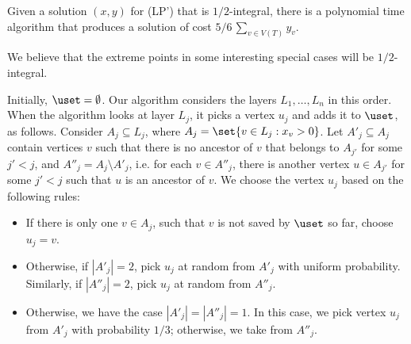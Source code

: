 \begin{theorem} 
Given a solution $(x,y)$ for (LP') that is $1/2$-integral, there is a polynomial time algorithm that produces a solution of cost $5/6\,\sum_{v \in V(T)} y_v$.  
\label{thm:12intalgo}
\end{theorem} 

We believe that the extreme points in some interesting special cases will be $1/2$-integral. 

\vspace{0.1in} 

Initially, $\uset = \emptyset$. 
Our algorithm considers the layers $L_1,\ldots, L_n$ in this order.
When the algorithm looks at layer $L_j$, it picks a vertex $u_j$ and adds it to $\uset$, as follows. 
Consider $A_j \subseteq L_j$, where $A_j = \set{v \in L_j: x_v >0}$.
Let $A'_j \subseteq A_j$ contain vertices $v$ such that there is no ancestor of $v$ that belongs to $A_{j'}$ for some $j' <j$, and $A''_j = A_j \setminus A'_j$, i.e. for each $v \in A''_j$, there is another vertex $u \in A_{j'}$ for some $j' <j$ such that $u$ is an ancestor of $v$.
We choose the vertex $u_j$ based on the following rules: 
\begin{itemize} 
\item If there is only one $v \in A_j$, such that $v$ is not saved by $\uset$ so far, choose $u_j=v$. 

\item Otherwise, if $|A'_j| =2$, pick $u_j$ at random from $A'_j$ with uniform probability.
Similarly, if $|A''_j| =2$, pick $u_j$ at random from $A''_j$.  

\item Otherwise, we have the case $|A'_j| = |A''_j| = 1$. In this case, we pick vertex $u_j$ from $A'_j$ with probability $1/3$; otherwise, we take from $A''_j$.  
\end{itemize}   


